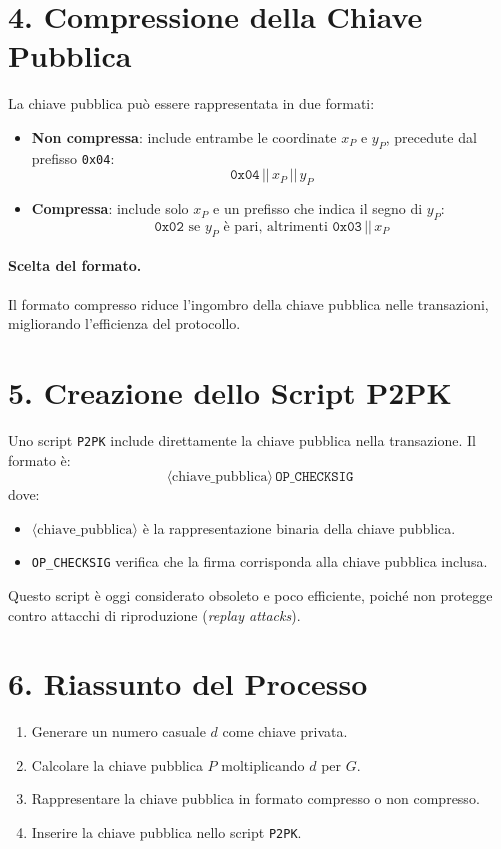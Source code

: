 \documentclass{article}
\begin{document}
\section*{4. Compressione della Chiave Pubblica}
La chiave pubblica può essere rappresentata in due formati:
\begin{itemize}
    \item \textbf{Non compressa}: include entrambe le coordinate \( x_P \) e \( y_P \), precedute dal prefisso \texttt{0x04}:
    \[
    \texttt{0x04} \, || \, x_P \, || \, y_P
    \]
    \item \textbf{Compressa}: include solo \( x_P \) e un prefisso che indica il segno di \( y_P \):
    \[
    \texttt{0x02} \text{ se } y_P \text{ è pari, altrimenti } \texttt{0x03} \, || \, x_P
    \]
\end{itemize}

\paragraph*{Scelta del formato.} Il formato compresso riduce l'ingombro della chiave pubblica nelle transazioni, migliorando l'efficienza del protocollo.

\section*{5. Creazione dello Script P2PK}
Uno script \texttt{P2PK} include direttamente la chiave pubblica nella transazione. Il formato è:
\[
\langle \text{chiave\_pubblica} \rangle \, \texttt{OP\_CHECKSIG}
\]
dove:
\begin{itemize}
    \item \(\langle \text{chiave\_pubblica} \rangle\) è la rappresentazione binaria della chiave pubblica.
    \item \texttt{OP\_CHECKSIG} verifica che la firma corrisponda alla chiave pubblica inclusa.
\end{itemize}

Questo script è oggi considerato obsoleto e poco efficiente, poiché non protegge contro attacchi di riproduzione (\textit{replay attacks}).

\section*{6. Riassunto del Processo}
\begin{enumerate}
    \item Generare un numero casuale \( d \) come chiave privata.
    \item Calcolare la chiave pubblica \( P \) moltiplicando \( d \) per \( G \).
    \item Rappresentare la chiave pubblica in formato compresso o non compresso.
    \item Inserire la chiave pubblica nello script \texttt{P2PK}.
\end{enumerate}
\end{document}
